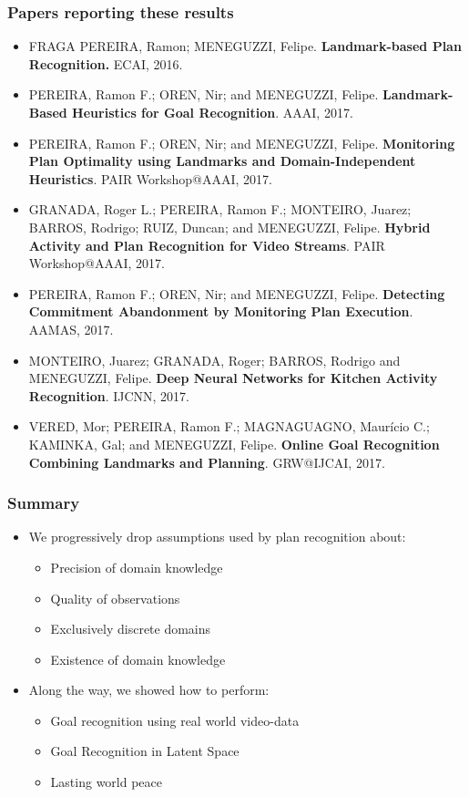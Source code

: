 \documentclass[usenames,dvipsnames]{beamer}
\begin{document}
\begin{frame}[c]\frametitle{Papers reporting these results}
	\footnotesize
	\begin{itemize}
	\item[] FRAGA PEREIRA, Ramon; MENEGUZZI, Felipe. \textbf{Landmark-based Plan Recognition.} ECAI, 2016.
	\item[] PEREIRA, Ramon F.; OREN, Nir; and MENEGUZZI, Felipe. \textbf{Landmark-Based Heuristics for Goal Recognition}. AAAI, 2017.
	\item[] PEREIRA, Ramon F.; OREN, Nir; and MENEGUZZI, Felipe. \textbf{Monitoring Plan Optimality using Landmarks and Domain-Independent Heuristics}. PAIR Workshop@AAAI, 2017.
    \item[] GRANADA, Roger L.; PEREIRA, Ramon F.; MONTEIRO, Juarez; BARROS, Rodrigo; RUIZ, Duncan; and MENEGUZZI, Felipe. \textbf{Hybrid Activity and Plan Recognition for Video Streams}. PAIR Workshop@AAAI, 2017.
    \item[] PEREIRA, Ramon F.; OREN, Nir; and MENEGUZZI, Felipe. \textbf{Detecting Commitment Abandonment by Monitoring Plan Execution}. AAMAS, 2017.
    \item[] MONTEIRO, Juarez; GRANADA, Roger; BARROS, Rodrigo and MENEGUZZI, Felipe. \textbf{Deep Neural Networks for Kitchen Activity Recognition}. IJCNN, 2017.
    \item[] VERED, Mor; PEREIRA, Ramon F.; MAGNAGUAGNO, Maurício C.; KAMINKA, Gal; and MENEGUZZI, Felipe. \textbf{Online Goal Recognition Combining Landmarks and Planning}. GRW@IJCAI, 2017.
	\end{itemize}
\end{frame}

\begin{frame}[c]\frametitle{Summary}
	\begin{itemize}
		\item We progressively drop assumptions used by plan recognition about:
		\begin{itemize}
			\item<1-> Precision of domain knowledge
			\item<2-> Quality of observations
			\item<3-> Exclusively discrete domains
			\item<4-> Existence of domain knowledge
		\end{itemize}
		\item Along the way, we showed how to perform:
		\begin{itemize}
			\item Goal recognition using real world video-data
			\item Goal Recognition in Latent Space
			\item Lasting world peace
		\end{itemize}
	\end{itemize}
\end{frame}
\end{document}
